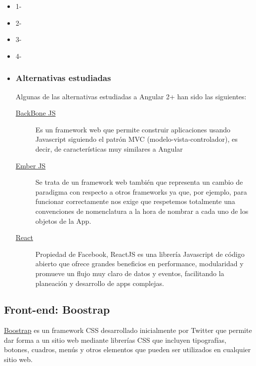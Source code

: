 \begin{itemize}
\tightlist
\item
1-
\item
2-
\item
3-
  \item
4-
\end{itemize}

\begin{itemize}
	\item	\subsubsection{Alternativas estudiadas}
	
	Algunas de las alternativas estudiadas a Angular 2+ han sido las siguientes:
	\begin{description}
\item[ \hyperlink{backbonejs.org/}{BackBone JS} ] Es un framework web que permite construir aplicaciones usando Javascript siguiendo el patrón MVC (modelo-vista-controlador), es decir, de características muy similares a Angular
\item[ \hyperlink{https://www.emberjs.com/}{Ember JS} ] Se trata de un framework web también que representa un cambio de paradigma con respecto a otros frameworks ya que, por ejemplo, para funcionar correctamente nos exige que respetemos totalmente una convenciones de nomenclatura a la hora de nombrar a cada uno de los objetos de la App.
\item[ \hyperlink{https://facebook.github.io/react/}{React} ] Propiedad de Facebook, ReactJS es una librería Javascript de código abierto que ofrece grandes beneficios en performance, modularidad y promueve un flujo muy claro de datos y eventos, facilitando la planeación y desarrollo de apps complejas. 
\end{description}
\end{itemize}


\subsection{Front-end: Boostrap}\label{tecnologias_boostrap}
\hyperlink{https://www.getbootstrap.com/}{Boostrap} es un framework CSS desarrollado inicialmente  por Twitter que permite dar forma a un sitio web mediante librerías CSS que incluyen tipografías, botones, cuadros, menús y otros elementos que pueden ser utilizados en cualquier sitio web.


